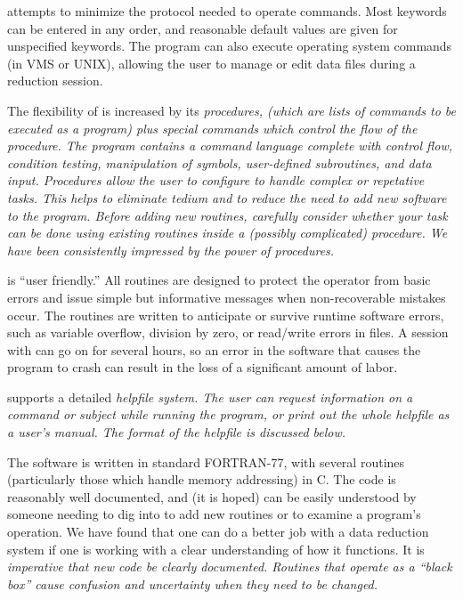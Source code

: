 \noindent
\hangindent 0.25in 
\V attempts to minimize the protocol needed to operate commands. Most
keywords can be entered in any order, and reasonable default values
are given for unspecified keywords.  The program can also execute operating
system commands (in VMS or UNIX), 
allowing the user to manage or edit data files 
during a reduction session. 

\hang
{}The flexibility of \V is increased by
its \it procedures\rm , (which are lists of commands to be executed as
a program) plus special commands which control the flow of the
procedure.  The program
contains a command language complete with control flow, condition
testing, manipulation of symbols, user-defined subroutines, and data
input. Procedures allow the user to configure \V to handle complex or
repetative tasks. This helps to eliminate tedium and to reduce the
need to add new software to the program. Before adding new routines,
carefully consider whether your task can be done using existing routines
inside a (possibly complicated) procedure. We have been consistently
impressed by the power of procedures.

\hang
{}\V is ``user friendly.'' All routines
are designed to protect the operator from basic errors and issue
simple but informative messages when non-recoverable mistakes occur.
The routines are written to anticipate or survive runtime software
errors, such as variable overflow, division by zero, or read/write
errors in files. A session with \V can go on for several hours, so an
error in the software that causes the program to crash can result in
the loss of a significant amount of labor. 
 
\hang
{}
\V supports a detailed \it helpfile \rm system. The user can request
information on a command or subject while running the program, or
print out the whole helpfile as a user's manual.  The format of the
helpfile is discussed below. 

	The \V software is written in standard FORTRAN-77, with several
routines (particularly those which handle memory addressing) in C.
The code is reasonably well documented, and
(it is hoped) can be easily understood by someone needing to dig into
\V to add new routines or to examine a program's operation. We have
found that one can do a better job with a data reduction system if one
is working with a clear understanding of how it functions. It is \it
imperative \rm that new code be clearly documented.  Routines that
operate as a ``black box'' cause confusion and uncertainty when they
need to be changed. 


